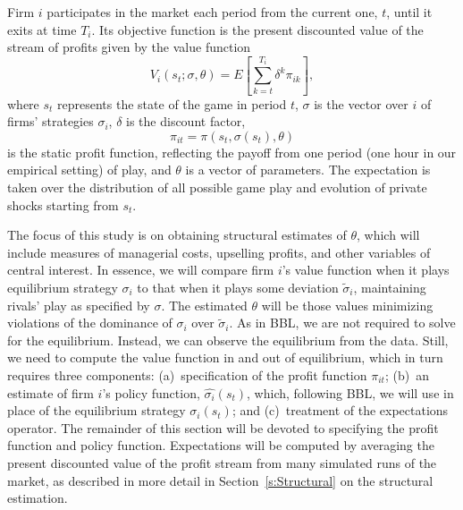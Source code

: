 \documentclass[11pt]{article}
\begin{document}
\begin{spacing}{1.3}
Firm $i$ participates in the market each period from the current one,
$t$, until it exits at time $T_i$. Its objective function is the
present discounted value of the stream of profits given by the value
function
\begin{equation}
\label{disprofit}
V_i(s_t; \sigma, \theta) = E \left[ \sum_{k=t}^{T_i} \delta^k \pi_{ik}
  \right],
\end{equation}
where $s_t$ represents the state of the game in period $t$, $\sigma$
is the vector over $i$ of firms' strategies $\sigma_i$, $\delta$ is
the discount factor,
\begin{equation}
\label{pi}
\pi_{it} = \pi(s_t, \sigma(s_t), \theta)
\end{equation}
is the static profit function, reflecting the payoff from one period
(one hour in our empirical setting) of play, and $\theta$ is a vector
of parameters. The expectation is taken over the distribution of all
possible game play and evolution of private shocks starting from
$s_t$.

The focus of this study is on obtaining structural estimates of
$\theta$, which will include measures of managerial costs, upselling
profits, and other variables of central interest. In essence, we will
compare firm $i$'s value function when it plays equilibrium strategy
$\sigma_i$ to that when it plays some deviation $\tilde{\sigma}_i$,
maintaining rivals' play as specified by $\sigma$.  The estimated
$\theta$ will be those values minimizing violations of the dominance
of $\sigma_i$ over $\tilde{\sigma}_i$. As in BBL, we are not required
to solve for the equilibrium.  Instead, we can observe the equilibrium
from the data. Still, we need to compute the value function in and out
of equilibrium, which in turn requires three components:
(a)~specification of the profit function $\pi_{it}$; (b)~an estimate
of firm $i$'s policy function, $\hat{\sigma_i}(s_t)$, which, following
BBL, we will use in place of the equilibrium strategy $\sigma_i(s_t)$;
and (c)~treatment of the expectations operator. The remainder of this
section will be devoted to specifying the profit function and policy
function. Expectations will be computed by averaging the present
discounted value of the profit stream from many simulated runs of the
market, as described in more detail in Section~\ref{s:Structural} on
the structural estimation.


\end{spacing}
\end{document}
